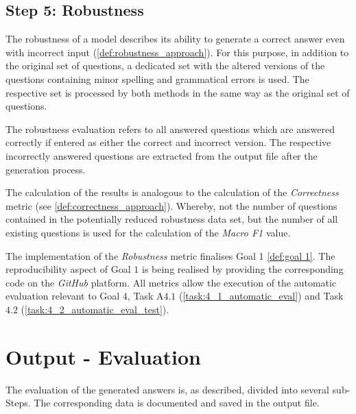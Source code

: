 \subsection{Step 5: Robustness}
The robustness of a model describes its ability to generate a correct answer even with incorrect input (\cref{def:robustness_approach}).
For this purpose, in addition to the original set of questions, a dedicated set with the altered versions of the questions containing minor spelling and grammatical errors is used.
The respective set is processed by both methods in the same way as the original set of questions.

The robustness evaluation refers to all answered questions which are answered correctly if entered as either the correct and incorrect version.
The respective incorrectly answered questions are extracted from the output file after the generation process.

The calculation of the results is analogous to the calculation of the \textit{Correctness} metric (see \cref{def:correctness_approach}). 
Whereby, not the number of questions contained in the potentially reduced robustness data set, but the number of all existing questions is used for the calculation of the \textit{Macro F1} value.
%

The implementation of the \textit{Robustness} metric finalises Goal 1 \cref{def:goal 1}. 
The reproducibility aspect of Goal $1$ is being realised by providing the corresponding code on the \textit{GitHub} platform.
All metrics allow the execution of the automatic evaluation relevant to Goal $4$, Task A$4.1$ (\cref{task:4_1_automatic_eval}) and Task $4.2$ (\cref{task:4_2_automatic_eval_test}).
% 
%
\section{Output - Evaluation}

The evaluation of the generated answers is, as described, divided into several sub-Steps.
The corresponding data is documented and saved in the output file.
